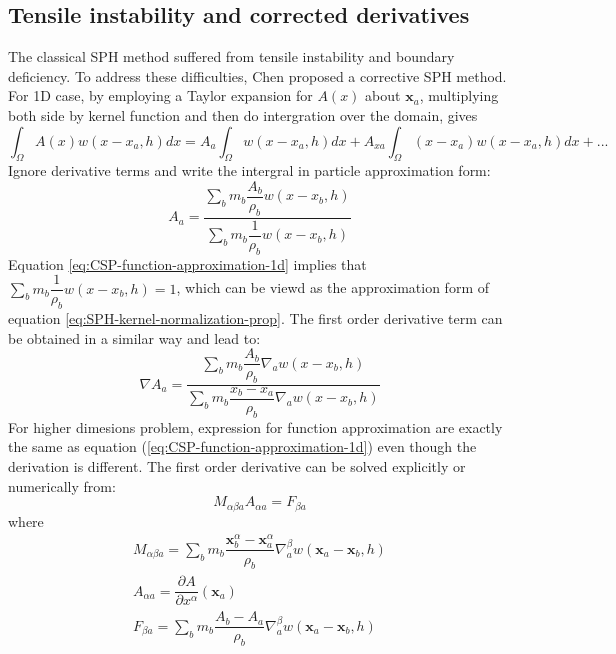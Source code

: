 \documentclass[10pt,a4paper]{article}
\begin{document}
\subsection{Tensile instability and corrected derivatives}
The classical SPH method suffered from tensile instability and boundary deficiency. To address these difficulties, Chen \cite{chen1999improvement} proposed a corrective SPH method. For 1D case, by employing a Taylor expansion for $A(x)$ about $\textbf{x}_a$, multiplying both side by kernel function and then do intergration over the domain, gives
\begin{equation}
\int_{\Omega} A(x) w(x- x_a, h) dx = 
A_a \int_{\Omega} w(x - x_a, h) dx +A_{xa} \int_{\Omega} (x-x_a) w(x - x_a, h) dx +...
\end{equation}
Ignore derivative terms and write the intergral in particle approximation form:
\begin{equation}
A_a = \frac{\sum_b m_b \dfrac{A_b}{\rho_b} w(x-x_b, h)}{\sum_b m_b \dfrac{1}{\rho_b} w(x-x_b, h)}
\label{eq:CSP-function-approximation-1d}
\end{equation}
Equation \ref{eq:CSP-function-approximation-1d} implies that $\sum_b m_b \dfrac{1}{\rho_b} w(x-x_b, h) = 1$, which can be viewd as the approximation form of equation \ref{eq:SPH-kernel-normalization-prop}. The first order derivative term can be obtained in a similar way and lead to:
\begin{equation}
\nabla A_a = \frac{\sum_b m_b \dfrac{A_b}{\rho_b} \nabla_a w(x-x_b, h)}{\sum_b m_b \dfrac{x_b - x_a}{\rho_b} \nabla_a w(x-x_b, h)}
\end{equation}
For higher dimesions problem, expression for function approximation are exactly the same as equation (\ref{eq:CSP-function-approximation-1d}) even though the derivation is different. The first order derivative can be solved explicitly or numerically from:
\begin{equation}
M_{\alpha \beta a} A_{\alpha a} = F_{\beta a}
\end{equation}
where
\begin{eqnarray}
M_{\alpha \beta a} = \sum_b m_b \dfrac{\textbf{x}_b^{\alpha} - \textbf{x}_a^{\alpha}}{\rho_b} \nabla_a^{\beta} w(\textbf{x}_a -\textbf{x}_b, h) \\
A_{\alpha a} = \dfrac{\partial A}{\partial x^{\alpha}} (\textbf{x}_a)\\
F_{\beta a} = \sum_b m_b \dfrac{A_b - A_a}{\rho_b} \nabla_a^{\beta} w(\textbf{x}_a -\textbf{x}_b, h)
\end{eqnarray}
\end{document}
